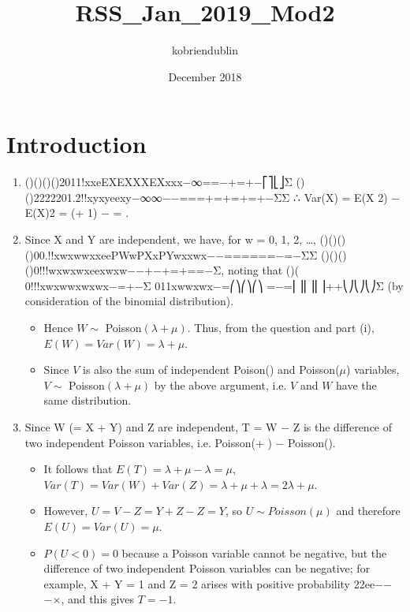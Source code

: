 \documentclass{article}
\title{RSS_Jan_2019_Mod2}
\author{kobriendublin }
\date{December 2018}
\begin{document}
\section{Introduction}

\begin{enumerate}
    \item ()()()()2011!xxeEXEXXXEXxxx\lambda\lambda−∞==−+=+−⎡⎤⎣⎦Σ
()()2222201.2!!xyxyeexy\lambda\lambda\lambda\lambda\lambda\lambda\lambda\lambda\lambda\lambda\lambda\lambda−∞∞−−===+=+=+=+−ΣΣ
∴ Var(X) = E(X 2) − {E(X)}2 = \lambda(\lambda + 1) −  = \lambda.

\item Since X and Y are independent, we have, for w = 0, 1, 2, …,
()()()()00.!!xwxwwxxeePWwPXxPYwxxwx\lambda\mu\lambda\mu−−======−=−ΣΣ
()()()()0!!!wxwxwxeexwxw\lambda\mu\lambda\mu\lambda\mu\lambda\mu−−+−+=+==−Σ,
noting that
()( 0!!!xwxwwxwxwx\lambda\mu\lambda\mu−=+−Σ
011xwwxwx\lambda\lambda\lambda\mu\lambda\mu−=⎛⎞⎛⎞⎛⎞ =−=⎜⎟⎜⎟⎜⎟++⎝⎠⎝⎠⎝⎠Σ
(by consideration of the binomial distribution).

\begin{itemize}
\item Hence $W \sim$ Poisson$(\lambda + \mu)$. Thus, from the question and part (i), $E(W) = Var(W) = \lambda + \mu$.
\item 
Since $V$ is also the sum of independent Poison(\lambda) and Poisson($\mu$) variables, $V \sim$ Poisson$(\lambda + \mu)$ by the above argument, i.e. $V$ and $W$ have the same distribution.
\end{itemize}
\item  Since W (= X + Y) and Z are independent, T = W − Z is the difference of two independent Poisson variables, i.e. Poisson(\lambda + \mu) − Poisson(\lambda). 

\begin{itemize}
\item It follows that $E(T) = \lambda + \mu − \lambda = \mu$, $Var(T) = Var(W) + Var(Z) = \lambda + \mu + \lambda = 2\lambda + \mu$.
\item However, $U = V − Z = Y + Z − Z = Y$, so $U \sim Poisson(\mu)$ and therefore $E(U) = Var(U) = \mu$.
\item $P(U < 0) = 0$ because a Poisson variable cannot be negative, but the difference of two independent Poisson variables can be negative; for example, X + Y = 1 and Z = 2 arises with positive probability 22ee\lambda\lambda\mu\lambda−−−×, and this gives $T = −1$.
\end{itemize}
\end{enumerate}
\end{document}
